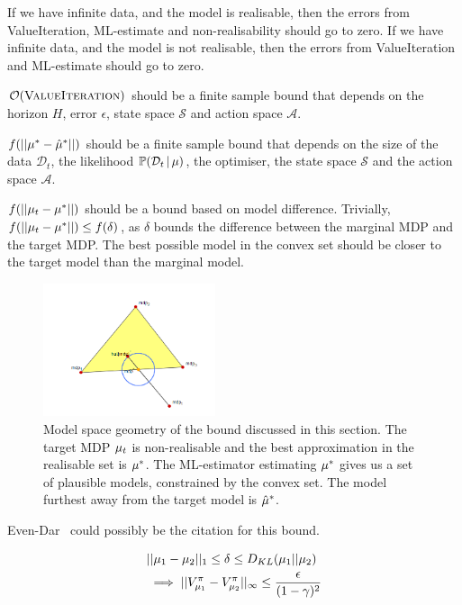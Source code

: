 If we have infinite data, and the model is realisable, then the errors from ValueIteration, ML-estimate and non-realisability should go to zero. If we have infinite data, and the model is not realisable, then the errors from ValueIteration and ML-estimate should go to zero.


$\mathcal{O}(\textsc{ValueIteration})$ should be a finite sample bound that depends on the horizon $H$, error $\epsilon$, state space $\mathcal{S}$ and action space $\mathcal{A}$.

$f(||\mu^{*}-\hat{\mu}^{*}||)$ should be a finite sample bound that depends on the size of the data $\mathcal{D}_t$, the likelihood $\mathbb{P}(\mathcal{D}_t \, | \, \mu)$, the optimiser, the state space $\mathcal{S}$ and the action space $\mathcal{A}$.

$f(||{\mu_t}-{\mu^{*}}||)$ should be a bound based on model difference. Trivially, $f(||{\mu_t}-{\mu^{*}}||) \leq f(\delta)$, as $\delta$ bounds the difference between the marginal MDP and the target MDP. The best possible model in the convex set should be closer to the target model than the marginal model.

\begin{figure}[h!]
    \centering
    \includegraphics[width=0.45\textwidth]{img/bound}
    \caption{Model space geometry of the bound discussed in this section. The target MDP $\mu_t$ is non-realisable and the best approximation in the realisable set is $\mu^{*}$. The ML-estimator estimating $\mu^{*}$ gives us a set of plausible models, constrained by the convex set. The model furthest away from the target model is $\hat{\mu}^{*}$.}
\end{figure}

Even-Dar~\cite{even2009online} could possibly be the citation for this bound.

\begin{align}
    &||\mu_1-\mu_2||_1 \leq \delta \leq D_{KL}(\mu_1 || \mu_2)\\&\implies ||V_{\mu_1}^\pi-V_{\mu_2}^\pi||_\infty \leq \frac{\epsilon}{(1-\gamma)^2}
\end{align}

